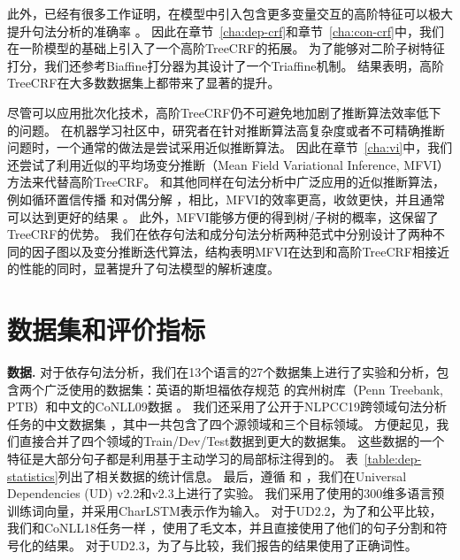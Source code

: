 此外，已经有很多工作证明，在模型中引入包含更多变量交互的高阶特征可以极大提升句法分析的准确率 \citep{mcdonald-pereira-2006-online,chen-manning-2014-fast,ji-etal-2019-graph}。
因此在章节~\ref{cha:dep-crf}和章节~\ref{cha:con-crf}中，我们在一阶模型的基础上引入了一个高阶TreeCRF的拓展。
为了能够对二阶子树特征打分，我们还参考Biaffine打分器为其设计了一个Triaffine机制。
结果表明，高阶TreeCRF在大多数数据集上都带来了显著的提升。

尽管可以应用批次化技术，高阶TreeCRF仍不可避免地加剧了推断算法效率低下的问题。
在机器学习社区中，研究者在针对推断算法高复杂度或者不可精确推断问题时，一个通常的做法是尝试采用近似推断算法。
因此在章节~\ref{cha:vi}中，我们还尝试了利用近似的平均场变分推断（Mean Field Variational Inference, MFVI）方法来代替高阶TreeCRF。
和其他同样在句法分析中广泛应用的近似推断算法，例如循环置信传播 \citep{smith-eisner-2008-dependency}和对偶分解 \citep{martins-etal-2009-concise}，相比，MFVI的效率更高，收敛更快，并且通常可以达到更好的结果 \citep{wang-etal-2019-second}。
此外，MFVI能够方便的得到树/子树的概率，这保留了TreeCRF的优势。
我们在依存句法和成分句法分析两种范式中分别设计了两种不同的因子图以及变分推断迭代算法，结构表明MFVI在达到和高阶TreeCRF相接近的性能的同时，显著提升了句法模型的解析速度。

\section{数据集和评价指标}



\noindent\textbf{数据.}
对于依存句法分析，我们在13个语言的27个数据集上进行了实验和分析，包含两个广泛使用的数据集：英语的斯坦福依存规范 \citep{chen-manning-2014-fast}的宾州树库（Penn Treebank, PTB）和中文的CoNLL09数据 \citep{hajic-etal-2009-conll}。
我们还采用了公开于NLPCC19跨领域句法分析任务的中文数据集 \citep{peng-etal-2019-overview}，其中一共包含了四个源领域和三个目标领域。
方便起见，我们直接合并了四个领域的Train/Dev/Test数据到更大的数据集。
这些数据的一个特征是大部分句子都是利用基于主动学习的局部标注得到的。
表~\ref{table:dep-statistics}列出了相关数据的统计信息。
最后，遵循 \citet{ji-etal-2019-graph}和 \citet{zhang-etal-2019-empirical}，我们在Universal Dependencies (UD) v2.2和v2.3上进行了实验。
我们采用了\citet{zeman-etal-2018-conll}使用的300维多语言预训练词向量，并采用CharLSTM表示作为输入。
对于UD2.2，为了和\citet{ji-etal-2019-graph}公平比较，我们和CoNLL18任务一样 \citep{zeman-etal-2018-conll}，使用了毛文本，并且直接使用了他们的句子分割和符号化的结果。
对于UD2.3，为了与\citet{zhang-etal-2019-empirical}比较，我们报告的结果使用了正确词性。

